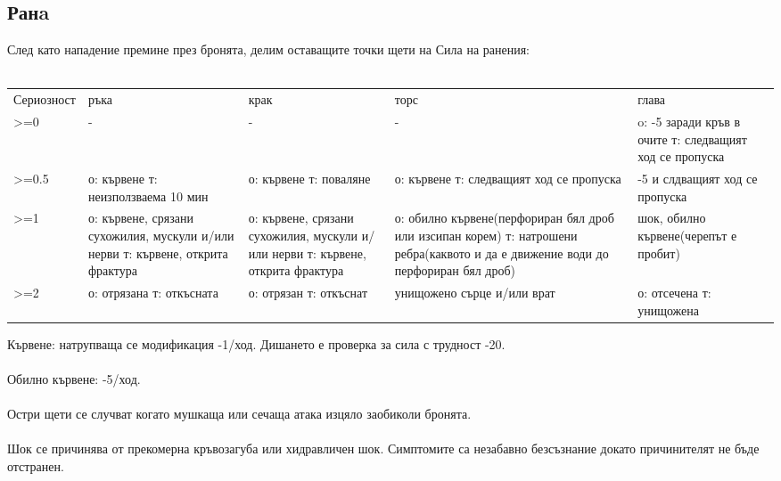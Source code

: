 \subsection{Ранa}
След като нападение премине през бронята, делим оставащите точки щети на Сила на ранения:
\\
\\
\begin{tabular}{ p{3cm} | p{3cm} | p{3cm} | p{3cm} | p{3cm} }
Сериозност & ръка                                                                             & крак                                                                            & торс                                     & глава                                                   \\
>=0        & -                                                                                & -                                                                               & -                                        & o: -5 заради кръв в очите т: следващият ход се пропуска \\
>=0.5      & о: кървене т: неизползваема 10 мин                                               & о: кървене т: поваляне                                                          & о: кървене т: следващият ход се пропуска & -5 и слдващият ход се пропуска     \\
>=1        & о: кървене, срязани сухожилия, мускули и/или нерви т: кървене, открита фрактура  & о: кървене, срязани сухожилия, мускули и/или нерви т: кървене, открита фрактура & о: обилно кървене(перфориран бял дроб или изсипан корем) т: натрошени ребра(каквото и да е движение води до перфориран бял дроб)                 & шок, обилно кървене(черепът е пробит) \\
>=2        & о: отрязана т: откъсната                                                         & о: отрязан т: откъснат                                                          & унищожено сърце и/или врат                                                       & о: отсечена т: унищожена \\
\end{tabular}

\noindent
Кървене: натрупваща се модификация -1/ход.
Дишането е проверка за сила с трудност -20.
\\
\\
Обилно кървене: -5/ход.
\\
\\
Остри щети се случват когато мушкаща или сечаща атака изцяло заобиколи бронята.
\\
\\
Шок се причинява от прекомерна кръвозагуба или хидравличен шок.
Симптомите са незабавно безсъзнание докато причинителят не бъде отстранен.


